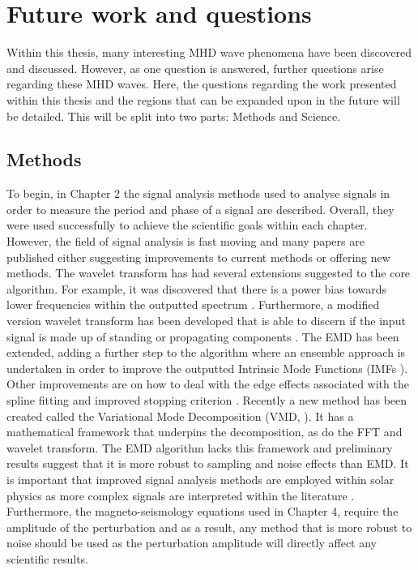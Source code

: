 \section{Future work and questions}
\label{future}

	Within this thesis, many interesting MHD wave phenomena have been discovered and discussed.
    However, as one question is answered, further questions arise regarding these MHD waves.
    Here, the questions regarding the work presented within this thesis and the regions that can be expanded upon in the future will be detailed.
    This will be split into two parts: Methods and Science.
    
    \subsection{Methods}

	To begin, in Chapter 2 the signal analysis methods used to analyse signals in order to measure the period and phase of a signal are described.
	Overall, they were used successfully to achieve the scientific goals within each chapter.
	However, the field of signal analysis is fast moving and many papers are published either suggesting improvements to current methods or offering new methods.
    The wavelet transform has had several extensions suggested to the core algorithm.
    For example, it was discovered that there is a power bias towards lower frequencies within the outputted spectrum \citep{liu2007rectification,veleda2012cross}.
    Furthermore, a modified version wavelet transform has been developed that is able to discern if the input signal is made up of standing or propagating components \citep{2008SoPh..248..395S}.
    The EMD has been extended, adding a further step to the algorithm where an ensemble approach is undertaken in order to improve the outputted Intrinsic Mode Functions (IMFs \citealt{wu2009ensemble}).
    Other improvements are on how to deal with the edge effects associated with the spline fitting \citep{zeng2004simple} and improved stopping criterion \citep{huang2008review}.
    Recently a new method has been created called the Variational Mode Decomposition (VMD, \citealt{6655981}).
    It has a mathematical framework that underpins the decomposition, as do the FFT and wavelet transform.
    The EMD algorithm lacks this framework and preliminary results suggest that it is more robust to sampling and noise effects than EMD.
    It is important that improved signal analysis methods are employed within solar physics as more complex signals are interpreted within the literature \citep{refId0}. 
    Furthermore, the magneto-seismology equations used in Chapter 4, require the amplitude of the perturbation and as a result, any method that is more robust to noise should be used as the perturbation amplitude will directly affect any scientific results.
    
